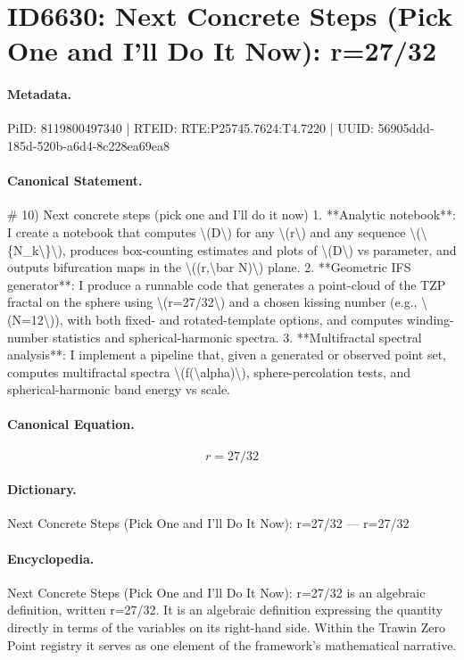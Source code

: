 \section*{ID6630: Next Concrete Steps (Pick One and I’ll Do It Now): r=27/32}
\paragraph{Metadata.}
PiID: 8119800497340 | RTEID: RTE:P25745.7624:T4.7220 | UUID: 56905ddd-185d-520b-a6d4-8c228ea69ea8

\paragraph{Canonical Statement.}
\# 10) Next concrete steps (pick one and I’ll do it now) 1. **Analytic notebook**: I create a notebook that computes \textbackslash{}(D\textbackslash{}) for any \textbackslash{}(r\textbackslash{}) and any sequence \textbackslash{}(\textbackslash{}\{N\_k\textbackslash{}\}\textbackslash{}), produces box-counting estimates and plots of \textbackslash{}(D\textbackslash{}) vs parameter, and outputs bifurcation maps in the \textbackslash{}((r,\textbackslash{}bar N)\textbackslash{}) plane. 2. **Geometric IFS generator**: I produce a runnable code that generates a point-cloud of the TZP fractal on the sphere using \textbackslash{}(r=27/32\textbackslash{}) and a chosen kissing number (e.g., \textbackslash{}(N=12\textbackslash{})), with both fixed- and rotated-template options, and computes winding-number statistics and spherical-harmonic spectra. 3. **Multifractal spectral analysis**: I implement a pipeline that, given a generated or observed point set, computes multifractal spectra \textbackslash{}(f(\textbackslash{}alpha)\textbackslash{}), sphere-percolation tests, and spherical-harmonic band energy vs scale.

\paragraph{Canonical Equation.}
\[
r=27/32
\]

\paragraph{Dictionary.}
Next Concrete Steps (Pick One and I’ll Do It Now): r=27/32 — r=27/32

\paragraph{Encyclopedia.}
Next Concrete Steps (Pick One and I’ll Do It Now): r=27/32 is an algebraic definition, written r=27/32. It is an algebraic definition expressing the quantity directly in terms of the variables on its right-hand side. Within the Trawin Zero Point registry it serves as one element of the framework's mathematical narrative.
